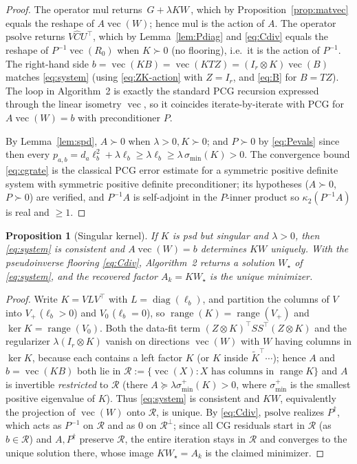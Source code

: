 \documentclass[12pt]{article}
\DeclareMathOperator{\vecop}{vec}
\DeclareMathOperator{\diag}{diag}
\DeclareMathOperator{\range}{range}
\newcommand{\tK}{\tilde{K}}
\newtheorem{proposition}{Proposition}
\begin{document}
\begin{proof}
The operator $\mathrm{mul}$ returns $\,G+\lambda KW\,$, which by
Proposition~\ref{prop:matvec} equals the reshape of
$A\vecop(W)$; hence $\mathrm{mul}$ is the action of $A$. The operator
$\mathrm{psolve}$ returns $V\widehat CU^{\top}$, which by
Lemma~\ref{lem:Pdiag} and \eqref{eq:Cdiv} equals the reshape of
$P^{-1}\vecop(R_0)$ when $K\succ0$ (no flooring), i.e.\ it is the action of
$P^{-1}$. The right-hand side $b=\vecop(KB)=\vecop(KTZ)=(I_r\otimes
K)\vecop(B)$ matches \eqref{eq:system} (using \eqref{eq:ZK-action} with
$Z=I_r$, and \eqref{eq:B} for $B=TZ$). The loop in Algorithm~2 is exactly
the standard PCG recursion expressed through the linear isometry $\vecop$,
so it coincides iterate-by-iterate with PCG for $A\vecop(W)=b$ with
preconditioner $P$.

By Lemma~\ref{lem:spd}, $A\succ0$ when $\lambda>0,K\succ0$; and $P\succ0$
by \eqref{eq:Pevals} since then every $p_{a,b}=d_a\ell_b^2+\lambda\ell_b\ge
\lambda\ell_b\ge\lambda\,\sigma_{\min}(K)>0$. The convergence bound
\eqref{eq:cgrate} is the classical PCG error estimate for a symmetric
positive definite system with symmetric positive definite preconditioner;
its hypotheses ($A\succ0$, $P\succ0$) are verified, and $P^{-1}A$ is
self-adjoint in the $P$-inner product so $\kappa_2(P^{-1}A)$ is real and
$\ge1$.
\end{proof}

\begin{proposition}[Singular kernel]\label{prop:singular}
If $K$ is psd but singular and $\lambda>0$, then \eqref{eq:system} is
consistent and $A\vecop(W)=b$ determines $KW$ uniquely. With the
pseudoinverse flooring \eqref{eq:Cdiv}, Algorithm~2 returns a solution
$W_\star$ of \eqref{eq:system}, and the recovered factor $A_k=KW_\star$ is
the unique minimizer.
\end{proposition}
\begin{proof}
Write $K=VLV^{\top}$ with $L=\diag(\ell_b)$, and partition the columns of
$V$ into $V_+$ ($\ell_b>0$) and $V_0$ ($\ell_b=0$), so
$\range(K)=\range(V_+)$ and $\ker K=\range(V_0)$. Both the data-fit term
$(Z\otimes K)^{\top}SS^{\top}(Z\otimes K)$ and the regularizer
$\lambda(I_r\otimes K)$ vanish on directions $\vecop(W)$ with
$W$ having columns in $\ker K$, because each contains a left factor $K$
(or $K$ inside $\tK^{\top}\!\cdots$); hence $A$ and $b=\vecop(KB)$ both lie
in $\mathcal R:=\{\vecop(X):X\text{ has columns in }\range K\}$ and $A$ is
invertible \emph{restricted} to $\mathcal R$ (there $A\succeq
\lambda\sigma_{\min}^{+}(K)>0$, where $\sigma_{\min}^{+}$ is the smallest
positive eigenvalue of $K$). Thus \eqref{eq:system} is consistent and
$KW$, equivalently the projection of $\vecop(W)$ onto $\mathcal R$, is
unique. By \eqref{eq:Cdiv}, $\mathrm{psolve}$ realizes $P^{\dagger}$, which
acts as $P^{-1}$ on $\mathcal R$ and as $0$ on $\mathcal R^{\perp}$; since
all CG residuals start in $\mathcal R$ (as $b\in\mathcal R$) and
$A,P^{\dagger}$ preserve $\mathcal R$, the entire iteration stays in
$\mathcal R$ and converges to the unique solution there, whose image
$KW_\star=A_k$ is the claimed minimizer.
\end{proof}
\end{document}
